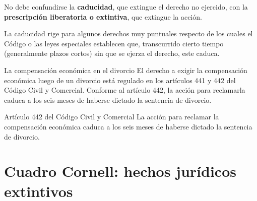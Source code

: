 \documentclass[12pt,oneside]{book}
\begin{document}
\begin{important}
No debe confundirse la \textbf{caducidad}, que extingue el derecho no ejercido, con la \textbf{prescripción liberatoria o extintiva}, que extingue la acción.
\end{important}

La caducidad rige para algunos derechos muy puntuales respecto de los cuales el Código o las leyes especiales establecen que, transcurrido cierto tiempo (generalmente plazos cortos) sin que se ejerza el derecho, este caduca.

\begin{example}{La compensación económica en el divorcio}
El derecho a exigir la compensación económica luego de un divorcio está regulado en los artículos 441 y 442 del Código Civil y Comercial. Conforme al artículo 442, la acción para reclamarla caduca a los seis meses de haberse dictado la sentencia de divorcio.
\end{example}

\begin{articulo}{Artículo 442 del Código Civil y Comercial}
La acción para reclamar la compensación económica caduca a los seis meses de haberse dictado la sentencia de divorcio.
\end{articulo}

\section{Cuadro Cornell: hechos jurídicos extintivos}
\end{document}
